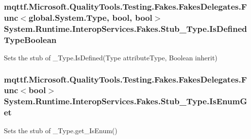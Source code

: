 \hypertarget{class_system_1_1_runtime_1_1_interop_services_1_1_fakes_1_1_stub___type_aa7c4989b66dee597b933a1c45fe6df24}{
\subsubsection[{Is\-Defined\-Type\-Boolean}]{\setlength{\rightskip}{0pt plus 5cm}mqttf.\-Microsoft.\-Quality\-Tools.\-Testing.\-Fakes.\-Fakes\-Delegates.\-Func$<$global.\-System.\-Type, bool, bool$>$ System.\-Runtime.\-Interop\-Services.\-Fakes.\-Stub\-\_\-\-Type.\-Is\-Defined\-Type\-Boolean}}\label{class_system_1_1_runtime_1_1_interop_services_1_1_fakes_1_1_stub___type_aa7c4989b66dee597b933a1c45fe6df24}


Sets the stub of \-\_\-\-Type.\-Is\-Defined(\-Type attribute\-Type, Boolean inherit)

\hypertarget{class_system_1_1_runtime_1_1_interop_services_1_1_fakes_1_1_stub___type_ab4e50a12140be1d639dfb3052ab1b54e}{
\subsubsection[{Is\-Enum\-Get}]{\setlength{\rightskip}{0pt plus 5cm}mqttf.\-Microsoft.\-Quality\-Tools.\-Testing.\-Fakes.\-Fakes\-Delegates.\-Func$<$bool$>$ System.\-Runtime.\-Interop\-Services.\-Fakes.\-Stub\-\_\-\-Type.\-Is\-Enum\-Get}}\label{class_system_1_1_runtime_1_1_interop_services_1_1_fakes_1_1_stub___type_ab4e50a12140be1d639dfb3052ab1b54e}


Sets the stub of \-\_\-\-Type.\-get\-\_\-\-Is\-Enum()

